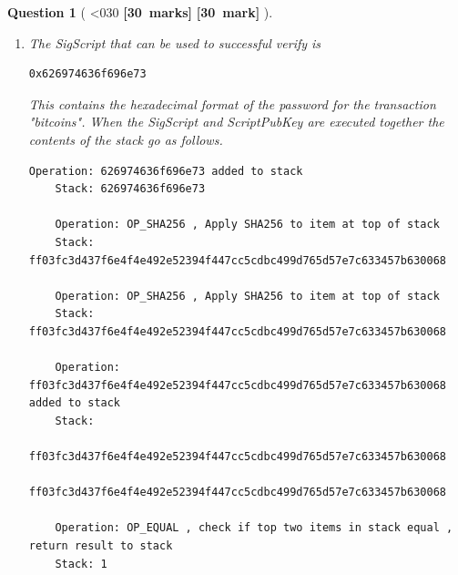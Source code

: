 \documentclass[a4paper]{article}
\theoremstyle{que}
\newtheorem{question}{Question}
\newcommand{\fixoffset}{\mbox{}\vspace*{-\bigskipamount}\vspace*{-\medskipamount}}
\newcommand\points[1]{%
\ifnum1<0#1\relax%
    {\bf \small [#1~marks]}%
  \else%
    {\bf \small [#1~mark]}%
  \fi%
}%
\begin{document}
\begin{question}[\points{30}]
  \fixoffset
  \begin{enumerate}[label=(\alph*)]
    \item The SigScript that can be used to successful verify is
    \begin{lstlisting}[basicstyle=\ttfamily]
    0x626974636f696e73
    \end{lstlisting}
    This contains the hexadecimal format of the password for the transaction "bitcoins". When the SigScript and ScriptPubKey are executed together the contents of the stack go as follows.
\begin{lstlisting}[basicstyle=\ttfamily, breaklines=true]
    Operation: 626974636f696e73 added to stack
    Stack: 626974636f696e73

    Operation: OP_SHA256 , Apply SHA256 to item at top of stack
    Stack: ff03fc3d437f6e4f4e492e52394f447cc5cdbc499d765d57e7c633457b630068

    Operation: OP_SHA256 , Apply SHA256 to item at top of stack
    Stack: ff03fc3d437f6e4f4e492e52394f447cc5cdbc499d765d57e7c633457b630068

    Operation: ff03fc3d437f6e4f4e492e52394f447cc5cdbc499d765d57e7c633457b630068 added to stack
    Stack:
    ff03fc3d437f6e4f4e492e52394f447cc5cdbc499d765d57e7c633457b630068
    ff03fc3d437f6e4f4e492e52394f447cc5cdbc499d765d57e7c633457b630068

    Operation: OP_EQUAL , check if top two items in stack equal , return result to stack
    Stack: 1


\end{lstlisting}
\end{enumerate}
\end{question}
\end{document}
